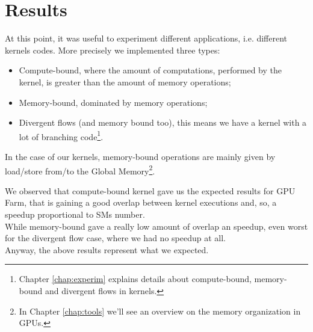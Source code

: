 	
\section{Results}
	At this point, it was useful to experiment different applications, i.e. different kernels codes. More precisely we implemented three types:
	\begin{itemize}
		\item Compute-bound, where the amount of computations, performed by the kernel, is  greater than the amount of memory operations;
		\item Memory-bound, dominated by memory operations;
		\item Divergent flows (and memory bound too), this means we have a kernel with a lot of branching code\footnote{Chapter \ref{chap:experim} explains details about compute-bound, memory-bound and divergent flows in kernels.}.
	\end{itemize}
	In the case of our kernels, memory-bound operations are mainly given by load/store from/to the Global Memory\footnote{In Chapter \ref{chap:tools} we'll see an overview on the memory organization in GPUs.}.
	
	We observed that compute-bound kernel gave us the expected results for GPU Farm, that is gaining a good overlap between kernel executions and, so, a speedup proportional to SMs number.\\
	While memory-bound gave a really low amount of overlap an speedup, even worst for the divergent flow case, where we had no speedup at all.\\
	Anyway, the above results represent what we expected.
	
	

